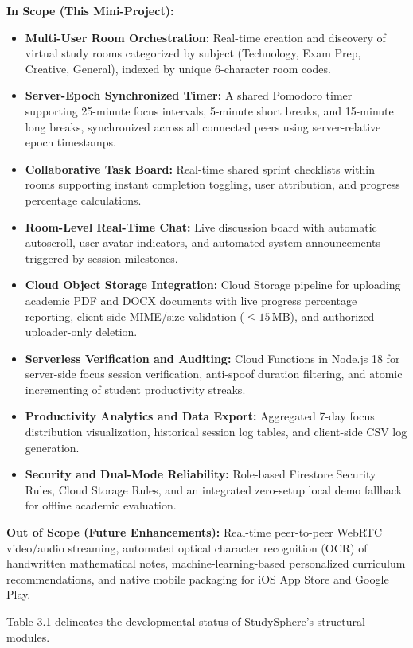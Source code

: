 \documentclass[12pt,a4paper,openany]{report}
\newcommand{\sectn}[2]{\par\needspace{4\baselineskip}\vspace{0.2cm}\noindent{\bfseries #1\ \ \MakeUppercase{#2}:}\par\nopagebreak}
\begin{document}
\sectn{3.2}{Scope}
\textbf{In Scope (This Mini-Project):}
\begin{itemize}
\item \textbf{Multi-User Room Orchestration:} Real-time creation and discovery of virtual study rooms categorized by subject (Technology, Exam Prep, Creative, General), indexed by unique 6-character room codes.
\item \textbf{Server-Epoch Synchronized Timer:} A shared Pomodoro timer supporting 25-minute focus intervals, 5-minute short breaks, and 15-minute long breaks, synchronized across all connected peers using server-relative epoch timestamps.
\item \textbf{Collaborative Task Board:} Real-time shared sprint checklists within rooms supporting instant completion toggling, user attribution, and progress percentage calculations.
\item \textbf{Room-Level Real-Time Chat:} Live discussion board with automatic autoscroll, user avatar indicators, and automated system announcements triggered by session milestones.
\item \textbf{Cloud Object Storage Integration:} Cloud Storage pipeline for uploading academic PDF and DOCX documents with live progress percentage reporting, client-side MIME/size validation ($\le 15$\,MB), and authorized uploader-only deletion.
\item \textbf{Serverless Verification and Auditing:} Cloud Functions in Node.js 18 for server-side focus session verification, anti-spoof duration filtering, and atomic incrementing of student productivity streaks.
\item \textbf{Productivity Analytics and Data Export:} Aggregated 7-day focus distribution visualization, historical session log tables, and client-side CSV log generation.
\item \textbf{Security and Dual-Mode Reliability:} Role-based Firestore Security Rules, Cloud Storage Rules, and an integrated zero-setup local demo fallback for offline academic evaluation.
\end{itemize}

\textbf{Out of Scope (Future Enhancements):}
Real-time peer-to-peer WebRTC video/audio streaming, automated optical character recognition (OCR) of handwritten mathematical notes, machine-learning-based personalized curriculum recommendations, and native mobile packaging for iOS App Store and Google Play.
 
\sectn{3.3}{Current Project Status}
Table 3.1 delineates the developmental status of StudySphere's structural modules.
 
\end{document}
